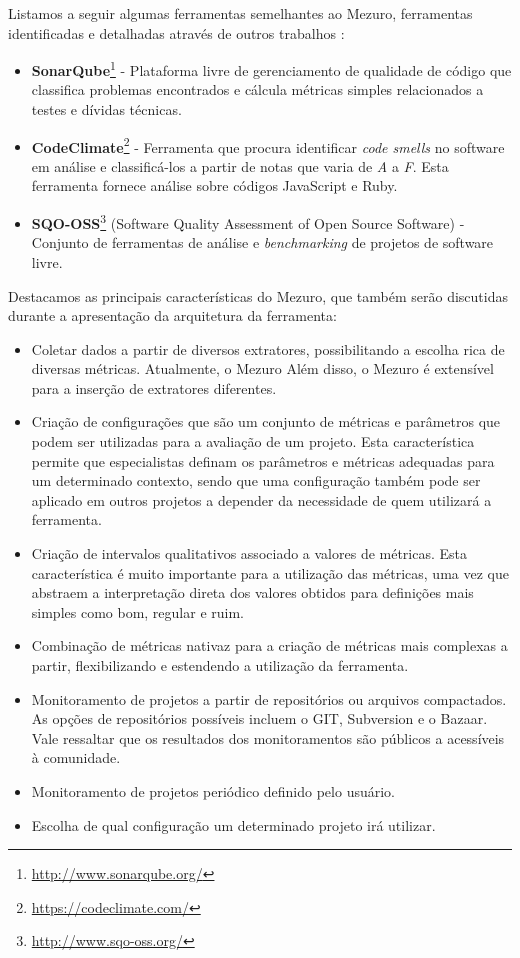 %

Listamos a seguir algumas ferramentas semelhantes ao Mezuro, ferramentas identificadas e detalhadas  através de outros trabalhos \cite{meirelles2010mezuro}\cite{vieira2013}\cite{manzo2014}:

%

\begin{itemize}
\item \textbf{SonarQube}\footnote{\url{http://www.sonarqube.org/}} - Plataforma livre de gerenciamento de qualidade de código que classifica problemas encontrados e cálcula métricas simples relacionados a testes e dívidas técnicas.
\item \textbf{CodeClimate}\footnote{\url{https://codeclimate.com/}} - Ferramenta que procura identificar \emph{code smells} no software em análise e classificá-los a partir de notas que varia de \emph{A} a \emph{F}. Esta ferramenta fornece análise sobre códigos JavaScript e Ruby.
\item \textbf{SQO-OSS}\footnote{\url{http://www.sqo-oss.org/}} (Software Quality Assessment of Open Source Software) - Conjunto de ferramentas de análise e \emph{benchmarking} de projetos de software livre.
\end{itemize}

%

Destacamos as principais características do Mezuro, que também serão discutidas durante a apresentação da arquitetura da ferramenta:

%

\begin{itemize}
\item Coletar dados a partir de diversos extratores, possibilitando a escolha  rica de diversas métricas. Atualmente, o Mezuro Além disso, o Mezuro é extensível para a inserção de extratores diferentes.
\item Criação de configurações que são um conjunto de métricas e parâmetros que podem ser utilizadas para a avaliação de um projeto. Esta característica permite que especialistas definam os parâmetros e métricas adequadas para um determinado contexto, sendo que uma configuração também pode ser aplicado em outros projetos a depender da necessidade de quem utilizará a ferramenta.
\item Criação de intervalos qualitativos associado a valores de métricas. Esta característica é muito importante para a utilização das métricas, uma vez que abstraem a interpretação direta dos valores obtidos para definições mais simples como bom, regular e ruim.
\item Combinação de métricas nativaz para a criação de métricas mais complexas a partir, flexibilizando e estendendo a utilização da ferramenta.
\item Monitoramento de projetos a partir de repositórios ou arquivos compactados. As opções de repositórios possíveis incluem o GIT, Subversion e o Bazaar. Vale ressaltar que os resultados dos monitoramentos são públicos a acessíveis à comunidade.
\item Monitoramento de projetos periódico definido pelo usuário.
\item Escolha de qual configuração um determinado projeto irá utilizar.
\end{itemize}

